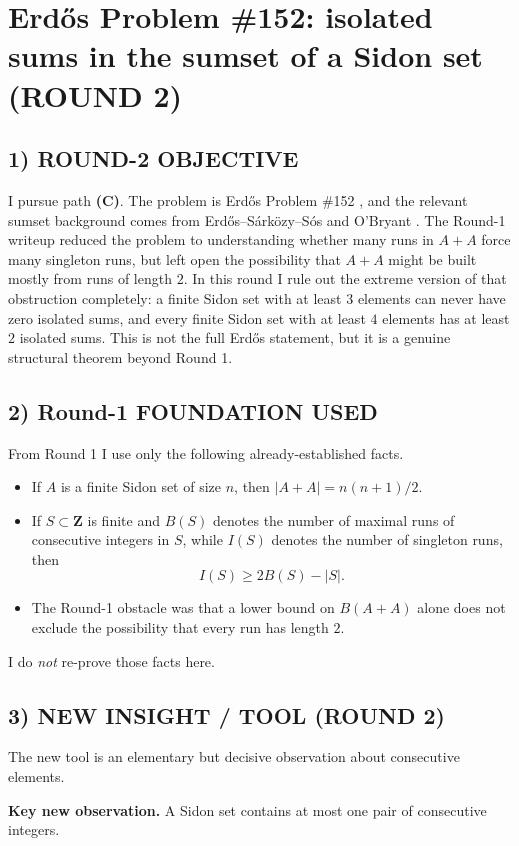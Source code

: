\section{Erd\H{o}s Problem \#152: isolated sums in the sumset of a Sidon set (ROUND 2)}

\subsection*{1) ROUND-2 OBJECTIVE}
I pursue path \textbf{(C)}.  The problem is Erd\H{o}s Problem \#152 \cite{Bloom152}, and the relevant sumset background comes from Erd\H{o}s--S\'ark\"ozy--S\'os and O'Bryant \cite{ESS94,OBryant04}.  The Round-1 writeup reduced the problem to understanding whether many runs in $A+A$ force many singleton runs, but left open the possibility that $A+A$ might be built mostly from runs of length $2$.  In this round I rule out the extreme version of that obstruction completely: a finite Sidon set with at least $3$ elements can never have zero isolated sums, and every finite Sidon set with at least $4$ elements has at least $2$ isolated sums.  This is not the full Erd\H{o}s statement, but it is a genuine structural theorem beyond Round 1.

\subsection*{2) Round-1 FOUNDATION USED}
From Round 1 I use only the following already-established facts.
\begin{itemize}
\item If $A$ is a finite Sidon set of size $n$, then $|A+A|=n(n+1)/2$.
\item If $S\subset \mathbf Z$ is finite and $B(S)$ denotes the number of maximal runs of consecutive integers in $S$, while $I(S)$ denotes the number of singleton runs, then
\[
I(S)\ge 2B(S)-|S|.
\]
\item The Round-1 obstacle was that a lower bound on $B(A+A)$ alone does not exclude the possibility that every run has length $2$.
\end{itemize}
I do \emph{not} re-prove those facts here.

\subsection*{3) NEW INSIGHT / TOOL (ROUND 2)}
The new tool is an elementary but decisive observation about consecutive elements.

\medskip
\noindent\textbf{Key new observation.}
A Sidon set contains at most one pair of consecutive integers.


